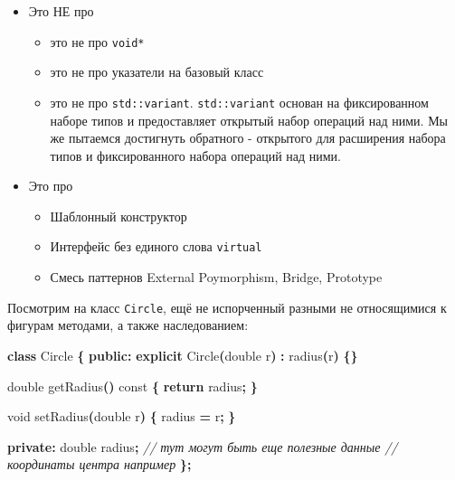 \documentclass[14pt,a4paper]{article}
\providecommand{\tightlist}{%
	\setlength{\itemsep}{0pt}\setlength{\parskip}{0pt}}
\newenvironment{Shaded}{\begin{paragraph}}{\end{paragraph}}
\newenvironment{Highlighting}{\begin{paragraph}}{\end{paragraph}}
\newcommand{\KeywordTok}[1]{\textcolor[rgb]{0.13,0.29,0.53}{\textbf{#1}}}
\newcommand{\DataTypeTok}[1]{\textcolor[rgb]{0.13,0.29,0.53}{#1}}
\newcommand{\CommentTok}[1]{\textcolor[rgb]{0.56,0.35,0.01}{\textit{#1}}}
\newcommand{\ControlFlowTok}[1]{\textcolor[rgb]{0.13,0.29,0.53}{\textbf{#1}}}
\newcommand{\OperatorTok}[1]{\textcolor[rgb]{0.81,0.36,0.00}{\textbf{#1}}}
\newcommand{\AttributeTok}[1]{\textcolor[rgb]{0.77,0.63,0.00}{#1}}
\newcommand{\NormalTok}[1]{#1}
\begin{document}
\begin{itemize}
\tightlist
\item
  Это НЕ про

  \begin{itemize}
  \tightlist
  \item
    это не про \texttt{void*}
  \item
    это не про указатели на базовый класс
  \item
    это не про \texttt{std::variant}. \texttt{std::variant} основан на
    фиксированном наборе типов и предоставляет открытый набор операций
    над ними. Мы же пытаемся достигнуть обратного - открытого для
    расширения набора типов и фиксированного набора операций над ними.
  \end{itemize}
\item
  Это про

  \begin{itemize}
  \tightlist
  \item
    Шаблонный конструктор
  \item
    Интерфейс без единого слова \texttt{virtual}
  \item
    Смесь паттернов External Poymorphism, Bridge, Prototype
  \end{itemize}
\end{itemize}

Посмотрим на класс \texttt{Circle}, ещё не испорченный разными не
относящимися к фигурам методами, а также наследованием:

\begin{Shaded}
\begin{Highlighting}[]
\KeywordTok{class}\NormalTok{ Circle }\OperatorTok{\{}
\KeywordTok{public}\OperatorTok{:}
    \KeywordTok{explicit}\NormalTok{ Circle}\OperatorTok{(}\DataTypeTok{double}\NormalTok{ r}\OperatorTok{)}
            \OperatorTok{:}\NormalTok{ radius}\OperatorTok{(}\NormalTok{r}\OperatorTok{)} \OperatorTok{\{\}}

    \DataTypeTok{double}\NormalTok{ getRadius}\OperatorTok{()} \AttributeTok{const} \OperatorTok{\{}
        \ControlFlowTok{return}\NormalTok{ radius}\OperatorTok{;}
    \OperatorTok{\}}

    \DataTypeTok{void}\NormalTok{ setRadius}\OperatorTok{(}\DataTypeTok{double}\NormalTok{ r}\OperatorTok{)} \OperatorTok{\{}
\NormalTok{        radius }\OperatorTok{=}\NormalTok{ r}\OperatorTok{;}
    \OperatorTok{\}}

\KeywordTok{private}\OperatorTok{:}
    \DataTypeTok{double}\NormalTok{ radius}\OperatorTok{;}
    \CommentTok{// тут могут быть еще полезные данные}
    \CommentTok{// координаты центра например}
\OperatorTok{\};}
\end{Highlighting}
\end{Shaded}
\end{document}
